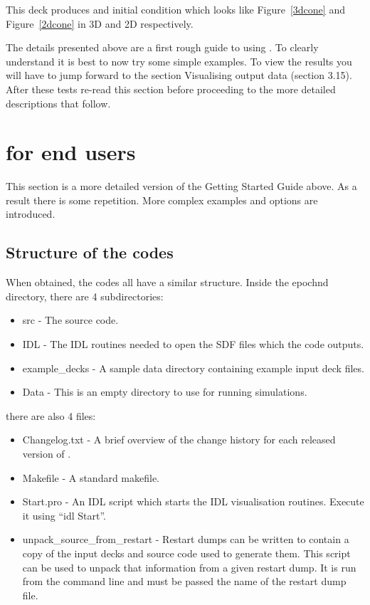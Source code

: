 \documentclass[12pt,a4paper]{article}
\newcommand{\EPOCH}{{\color{warwickdark}\fontfamily{phv}\selectfont{EPOCH}}}
\begin{document}
This deck produces and initial condition which looks like Figure~\ref{3dcone}
and Figure~\ref{2dcone} in 3D and 2D respectively.

The details presented above are a first rough guide to using {\EPOCH}. To
clearly understand {\EPOCH} it is best to now try some simple examples. To
view the results you will have to jump forward to the section
Visualising {\EPOCH} output data (section 3.15). After these tests re-read
this section before proceeding to the more detailed descriptions that follow.


\clearpage

\section{{\EPOCH} for end users}
This section is a more detailed version of the Getting Started Guide above. As
a result there is some repetition. More complex examples and options are
introduced.
\label{sec:endusers}

\subsection{Structure of the {\EPOCH} codes}
When obtained, the {\EPOCH} codes all have a similar structure. Inside the
epoch{n}d directory, there are 4 subdirectories:

\begin{itemize}
\item src - The {\EPOCH} source code.
\item IDL - The IDL routines needed to open the SDF files which the code
  outputs.
\item example\_decks - A sample data directory containing example input deck
  files.
\item Data - This is an empty directory to use for running simulations.
\end{itemize}

there are also 4 files:

\begin{itemize}
\item Changelog.txt - A brief overview of the change history for each
  released version of {\EPOCH}.
\item Makefile - A standard makefile.
\item Start.pro - An IDL script which starts the IDL visualisation
  routines. Execute it using ``idl Start''.
\item unpack\_source\_from\_restart - Restart dumps can be written to contain
  a copy of the input decks and source code used to generate them. This script
  can be used to unpack that information from a given restart dump. It is run
  from the command line and must be passed the name of the restart dump file.
\end{itemize}
\end{document}
